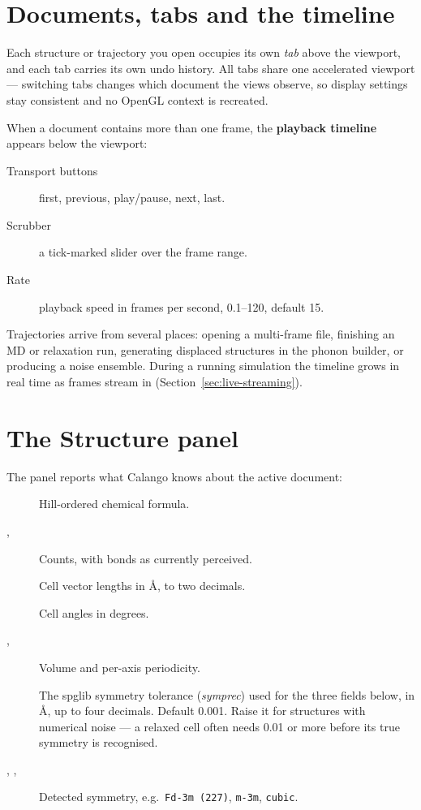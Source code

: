 \section{Documents, tabs and the timeline}

Each structure or trajectory you open occupies its own \emph{tab} above the
viewport, and each tab carries its own undo history. All tabs share one
accelerated viewport --- switching tabs changes which document the views
observe, so display settings stay consistent and no OpenGL context is
recreated.

When a document contains more than one frame, the \textbf{playback
timeline} appears below the viewport:

\begin{description}
  \item[Transport buttons] first, previous, play/pause, next, last.
  \item[Scrubber] a tick-marked slider over the frame range.
  \item[Rate] playback speed in frames per second, 0.1--120, default 15.
\end{description}

Trajectories arrive from several places: opening a multi-frame file,
finishing an MD or relaxation run, generating displaced structures in the
phonon builder, or producing a noise ensemble. During a running simulation
the timeline grows in real time as frames stream in
(Section~\ref{sec:live-streaming}).

\section{The Structure panel}
\label{sec:structure-panel}

The  panel reports what Calango knows about the active
document:

\begin{description}
  \item[] Hill-ordered chemical formula.
  \item[, ] Counts, with bonds as currently perceived.
  \item[] Cell vector lengths in \AA{}, to two decimals.
  \item[\ui{$\alpha$, $\beta$, $\gamma$}] Cell angles in degrees.
  \item[, ] Volume and per-axis periodicity.
  \item[] The spglib symmetry tolerance (\emph{symprec}) used
    for the three fields below, in \AA{}, up to four decimals. Default
    0.001. Raise it for structures with numerical noise --- a relaxed cell
    often needs 0.01 or more before its true symmetry is recognised.
  \item[, , ] Detected
    symmetry, e.g.\ \texttt{Fd-3m (227)}, \texttt{m-3m}, \texttt{cubic}.
\end{description}

